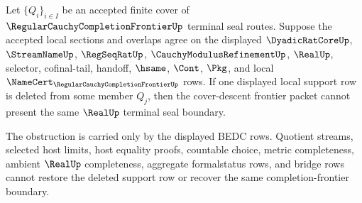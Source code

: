 \begin{theorem}
\label{thm:regular-cauchy-completion-frontier-finite-cover-support-removal-obstruction}
Let $\{Q_i\}_{i \in I}$ be an accepted finite cover of $\RegularCauchyCompletionFrontierUp$ terminal seal routes. Suppose the accepted local sections and overlaps agree on the displayed $\DyadicRatCoreUp$, $\StreamNameUp$, $\RegSeqRatUp$, $\CauchyModulusRefinementUp$, $\RealUp$, selector, cofinal-tail, handoff, $\hsame$, $\Cont$, $\Pkg$, and local $\NameCert_{\RegularCauchyCompletionFrontierUp}$ rows. If one displayed local support row is deleted from some member $Q_j$, then the cover-descent frontier packet cannot present the same $\RealUp$ terminal seal boundary.

The obstruction is carried only by the displayed BEDC rows. Quotient streams, selected host limits, host equality proofs, countable choice, metric completeness, ambient $\RealUp$ completeness, aggregate formalstatus rows, and bridge rows cannot restore the deleted support row or recover the same completion-frontier boundary.
\end{theorem}
